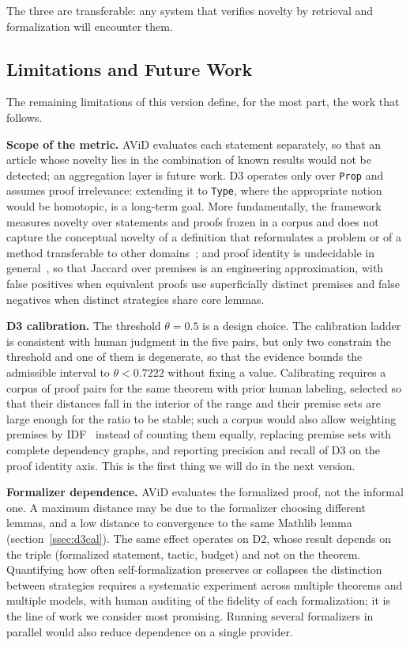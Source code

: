 \documentclass{article}
\theoremstyle{remark}
\begin{document}
The three are transferable: any system that verifies novelty by retrieval and formalization will encounter them.

\subsection{Limitations and Future Work}
\label{sec:limitaciones}

The remaining limitations of this version define, for the most part, the work that follows.

\textbf{Scope of the metric.} AViD evaluates each statement separately, so that an article whose novelty lies in the combination of known results would not be detected; an aggregation layer is future work. D3 operates only over \texttt{Prop} and assumes proof irrelevance: extending it to \texttt{Type}, where the appropriate notion would be homotopic, is a long-term goal. More fundamentally, the framework measures novelty over statements and proofs frozen in a corpus and does not capture the conceptual novelty of a definition that reformulates a problem or of a method transferable to other domains~\cite{lakatos1976}; and proof identity is undecidable in general~\cite{dosen2003}, so that Jaccard over premises is an engineering approximation, with false positives when equivalent proofs use superficially distinct premises and false negatives when distinct strategies share core lemmas.

\textbf{D3 calibration.} The threshold $\theta = 0.5$ is a design choice. The calibration ladder is consistent with human judgment in the five pairs, but only two constrain the threshold and one of them is degenerate, so that the evidence bounds the admissible interval to $\theta < 0.7222$ without fixing a value. Calibrating requires a corpus of proof pairs for the same theorem with prior human labeling, selected so that their distances fall in the interior of the range and their premise sets are large enough for the ratio to be stable; such a corpus would also allow weighting premises by IDF~\cite{huch2022} instead of counting them equally, replacing premise sets with complete dependency graphs, and reporting precision and recall of D3 on the proof identity axis. This is the first thing we will do in the next version.

\textbf{Formalizer dependence.} AViD evaluates the formalized proof, not the informal one. A maximum distance may be due to the formalizer choosing different lemmas, and a low distance to convergence to the same Mathlib lemma (section~\ref{ssec:d3cal}). The same effect operates on D2, whose result depends on the triple (formalized statement, tactic, budget) and not on the theorem. Quantifying how often self-formalization preserves or collapses the distinction between strategies requires a systematic experiment across multiple theorems and multiple models, with human auditing of the fidelity of each formalization; it is the line of work we consider most promising. Running several formalizers in parallel would also reduce dependence on a single provider.
\end{document}
